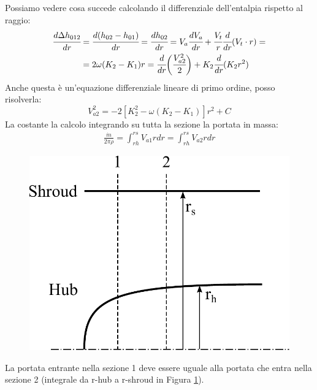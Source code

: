 Possiamo vedere cosa succede calcolando il differenziale dell'entalpia rispetto al raggio:
\begin{align*}
\begin{split}
\cfrac{d \Delta h_{012}}{dr} &= \cfrac{d ( h_{02}-h_{01})}{dr} = \cfrac{dh_{02}}{dr} = V_a \cfrac{dV_a}{dr} + \cfrac{V_t}{r} \cfrac{d}{dr} (V_t \cdot r) = \\
& =2 \omega (K_2 - K_1) r = \cfrac{d}{dr} \bigg( \cfrac{V_{a2}^2}{2} \bigg) + K_2 \cfrac{d}{dr} (K_2 r^2)
\end{split}
\end{align*}
Anche questa è un'equazione differenziale lineare di primo ordine, posso risolverla:
\begin{equation}
\boxed{V_{a2}^2 = -2 \left[ K_2^2 - \omega \left( K_2 - K_1 \right) \right] r^2 + C}
\label{eq:valleVorticeForzato}
\end{equation}
La costante la calcolo integrando su tutta la sezione la portata in massa:
\begin{align*}
\frac{\dot{m}}{2 \pi \rho} = \int_{rh}^{rs} V_{a1} r dr = \int_{rh}^{rs} V_{a2} r dr
\end{align*}
\begin{figure}[h]
\centering
  \includegraphics[width=.4\textwidth]{fig/HubShroud.pdf}
\caption{}
\label{fig:hubshroud}
\end{figure}
La portata entrante nella sezione 1 deve essere uguale alla portata che entra nella sezione 2 (integrale da r-hub a r-shroud in Figura \ref{fig:hubshroud}).

